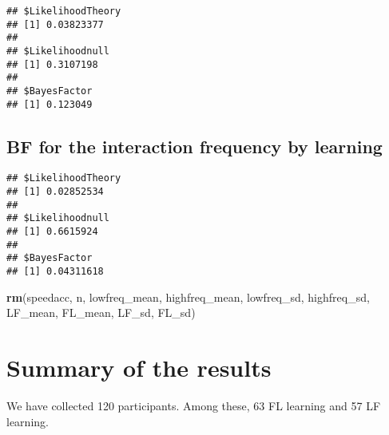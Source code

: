 \documentclass[
]{article}
\newenvironment{Shaded}{\begin{snugshade}}{\end{snugshade}}
\newcommand{\CommentTok}[1]{\textcolor[rgb]{0.56,0.35,0.01}{\textit{#1}}}
\newcommand{\DataTypeTok}[1]{\textcolor[rgb]{0.13,0.29,0.53}{#1}}
\newcommand{\DecValTok}[1]{\textcolor[rgb]{0.00,0.00,0.81}{#1}}
\newcommand{\KeywordTok}[1]{\textcolor[rgb]{0.13,0.29,0.53}{\textbf{#1}}}
\newcommand{\NormalTok}[1]{#1}
\newcommand{\OperatorTok}[1]{\textcolor[rgb]{0.81,0.36,0.00}{\textbf{#1}}}
\newcommand{\StringTok}[1]{\textcolor[rgb]{0.31,0.60,0.02}{#1}}
\begin{document}
\begin{verbatim}
## $LikelihoodTheory
## [1] 0.03823377
## 
## $Likelihoodnull
## [1] 0.3107198
## 
## $BayesFactor
## [1] 0.123049
\end{verbatim}

\hypertarget{bf-for-the-interaction-frequency-by-learning}{%
\subsection{BF for the interaction frequency by
learning}\label{bf-for-the-interaction-frequency-by-learning}}

\begin{Shaded}
\end{Shaded}

\begin{verbatim}
## $LikelihoodTheory
## [1] 0.02852534
## 
## $Likelihoodnull
## [1] 0.6615924
## 
## $BayesFactor
## [1] 0.04311618
\end{verbatim}

\begin{Shaded}
\begin{Highlighting}[]
\KeywordTok{rm}\NormalTok{(speedacc, n, lowfreq_mean, highfreq_mean, lowfreq_sd, highfreq_sd, LF_mean, FL_mean, LF_sd, FL_sd)}
\end{Highlighting}
\end{Shaded}

\hypertarget{summary-of-the-results}{%
\section{Summary of the results}\label{summary-of-the-results}}

We have collected 120 participants. Among these, 63 FL learning and 57
LF learning.
\end{document}
